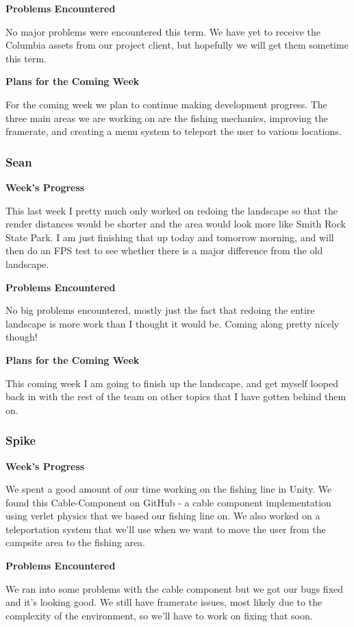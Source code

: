 \documentclass[10pt,journal,compsoc,onecolumn, draftclsnofoot]{IEEEtran}
\begin{document}
\noindent \textbf{Problems Encountered}

No major problems were encountered this term. We have yet to receive the Columbia assets from our project client, but hopefully we will get them sometime this term.

\noindent \textbf{Plans for the Coming Week}

For the coming week we plan to continue making development progress. The three main areas we are working on are the fishing mechanics, improving the framerate, and creating a menu system to teleport the user to various locations.

\subsubsection{Sean}
\noindent \textbf{Week's Progress}

This last week I pretty much only worked on redoing the landscape so that the render distances would be shorter and the area would look more like Smith Rock State Park. I am just finishing that up today and tomorrow morning, and will then do an FPS test to see whether there is a major difference from the old landscape.

\noindent \textbf{Problems Encountered}

No big problems encountered, mostly just the fact that redoing the entire landscape is more work than I thought it would be. Coming along pretty nicely though!

\noindent \textbf{Plans for the Coming Week}

This coming week I am going to finish up the landscape, and get myself looped back in with the rest of the team on other topics that I have gotten behind them on.

\subsubsection{Spike}
\noindent \textbf{Week's Progress}

We spent a good amount of our time working on the fishing line in Unity. We found this Cable-Component on GitHub - a cable component implementation using verlet physics that we based our fishing line on. We also worked on a teleportation system that we'll use when we want to move the user from the campsite area to the fishing area.

\noindent \textbf{Problems Encountered}

We ran into some problems with the cable component but we got our bugs fixed and it's looking good. We still have framerate issues, most likely due to the complexity of the environment, so we'll have to work on fixing that soon.
\end{document}
